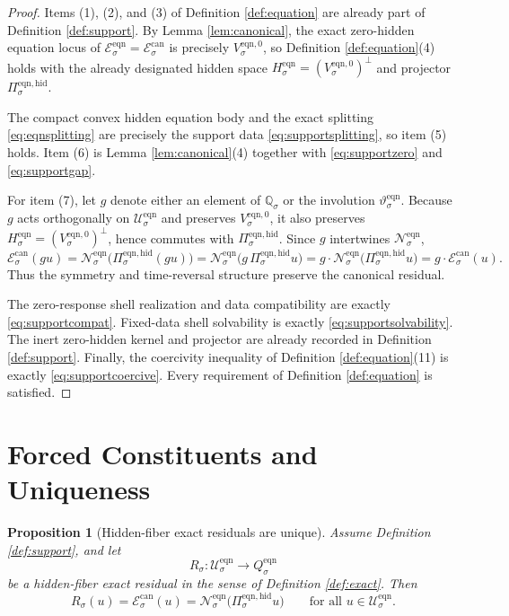 \documentclass[11pt]{article}
\newcommand{\EqnSpace}[1]{\mathcal U_{#1}^{\mathrm{eqn}}}
\newcommand{\EqnTarget}[1]{Q_{#1}^{\mathrm{eqn}}}
\newcommand{\EqnResidual}[1]{\mathcal E_{#1}^{\mathrm{eqn}}}
\newcommand{\EqnResidualCan}[1]{\mathcal E_{#1}^{\mathrm{can}}}
\newcommand{\EqnZero}[1]{V_{#1}^{\mathrm{eqn},0}}
\newcommand{\EqnHidden}[1]{H_{#1}^{\mathrm{eqn}}}
\newcommand{\EqnProj}[1]{\Pi_{#1}^{\mathrm{eqn,hid}}}
\newcommand{\EqnLin}[1]{\mathcal N_{#1}^{\mathrm{eqn}}}
\newcommand{\EqnSym}[1]{\mathbb Q_{#1}}
\newcommand{\EqnTime}[1]{\vartheta_{#1}^{\mathrm{eqn}}}
\newtheorem{proposition}{Proposition}
\begin{document}
\begin{proof}
Items (1), (2), and (3) of Definition \ref{def:equation} are already part of Definition \ref{def:support}. By Lemma \ref{lem:canonical}, the exact zero-hidden equation locus of \(\EqnResidual{\sigma}=\EqnResidualCan{\sigma}\) is precisely \(\EqnZero{\sigma}\), so Definition \ref{def:equation}(4) holds with the already designated hidden space \(\EqnHidden{\sigma}=(\EqnZero{\sigma})^{\perp}\) and projector \(\EqnProj{\sigma}\).

The compact convex hidden equation body and the exact splitting \eqref{eq:eqnsplitting} are precisely the support data \eqref{eq:supportsplitting}, so item (5) holds. Item (6) is Lemma \ref{lem:canonical}(4) together with \eqref{eq:supportzero} and \eqref{eq:supportgap}.

For item (7), let \(g\) denote either an element of \(\EqnSym{\sigma}\) or the involution \(\EqnTime{\sigma}\). Because \(g\) acts orthogonally on \(\EqnSpace{\sigma}\) and preserves \(\EqnZero{\sigma}\), it also preserves \(\EqnHidden{\sigma}=(\EqnZero{\sigma})^{\perp}\), hence commutes with \(\EqnProj{\sigma}\). Since \(g\) intertwines \(\EqnLin{\sigma}\),
\[
\EqnResidualCan{\sigma}(g u)
=
\EqnLin{\sigma}\bigl(\EqnProj{\sigma}(g u)\bigr)
=
\EqnLin{\sigma}\bigl(g\,\EqnProj{\sigma}u\bigr)
=
g\cdot \EqnLin{\sigma}\bigl(\EqnProj{\sigma}u\bigr)
=
g\cdot \EqnResidualCan{\sigma}(u).
\]
Thus the symmetry and time-reversal structure preserve the canonical residual.

The zero-response shell realization and data compatibility are exactly \eqref{eq:supportcompat}. Fixed-data shell solvability is exactly \eqref{eq:supportsolvability}. The inert zero-hidden kernel and projector are already recorded in Definition \ref{def:support}. Finally, the coercivity inequality of Definition \ref{def:equation}(11) is exactly \eqref{eq:supportcoercive}. Every requirement of Definition \ref{def:equation} is satisfied.
\end{proof}

\section{Forced Constituents and Uniqueness}

\begin{proposition}[Hidden-fiber exact residuals are unique]
\label{prop:unique}
Assume Definition \ref{def:support}, and let
\[
R_{\sigma}:\EqnSpace{\sigma}\to\EqnTarget{\sigma}
\]
be a hidden-fiber exact residual in the sense of Definition \ref{def:exact}. Then
\begin{equation}
R_{\sigma}(u)
=
\EqnResidualCan{\sigma}(u)
=
\EqnLin{\sigma}\bigl(\EqnProj{\sigma}u\bigr)
\qquad
\text{for all }u\in\EqnSpace{\sigma}.
\label{eq:unique}
\end{equation}
\end{proposition}
\end{document}
